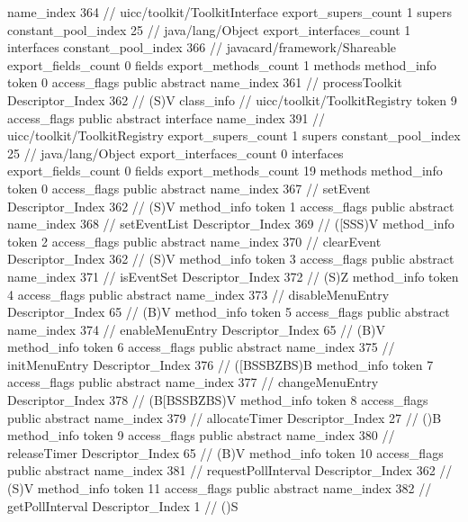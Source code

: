 {{{			name_index	364		// uicc/toolkit/ToolkitInterface
			export_supers_count	1
			supers {
				constant_pool_index	25		// java/lang/Object
			}
			export_interfaces_count	1
			interfaces {
				constant_pool_index	366		// javacard/framework/Shareable
			}
			export_fields_count	0
			fields {
			}
			export_methods_count	1
			methods {
				method_info {
					token	0
					access_flags	public abstract
					name_index	361		// processToolkit
					Descriptor_Index	362		// (S)V
				}
			}
		}
		class_info {		// uicc/toolkit/ToolkitRegistry
			token	9
			access_flags	public abstract interface
			name_index	391		// uicc/toolkit/ToolkitRegistry
			export_supers_count	1
			supers {
				constant_pool_index	25		// java/lang/Object
			}
			export_interfaces_count	0
			interfaces {
			}
			export_fields_count	0
			fields {
			}
			export_methods_count	19
			methods {
				method_info {
					token	0
					access_flags	public abstract
					name_index	367		// setEvent
					Descriptor_Index	362		// (S)V
				}
				method_info {
					token	1
					access_flags	public abstract
					name_index	368		// setEventList
					Descriptor_Index	369		// ([SSS)V
				}
				method_info {
					token	2
					access_flags	public abstract
					name_index	370		// clearEvent
					Descriptor_Index	362		// (S)V
				}
				method_info {
					token	3
					access_flags	public abstract
					name_index	371		// isEventSet
					Descriptor_Index	372		// (S)Z
				}
				method_info {
					token	4
					access_flags	public abstract
					name_index	373		// disableMenuEntry
					Descriptor_Index	65		// (B)V
				}
				method_info {
					token	5
					access_flags	public abstract
					name_index	374		// enableMenuEntry
					Descriptor_Index	65		// (B)V
				}
				method_info {
					token	6
					access_flags	public abstract
					name_index	375		// initMenuEntry
					Descriptor_Index	376		// ([BSSBZBS)B
				}
				method_info {
					token	7
					access_flags	public abstract
					name_index	377		// changeMenuEntry
					Descriptor_Index	378		// (B[BSSBZBS)V
				}
				method_info {
					token	8
					access_flags	public abstract
					name_index	379		// allocateTimer
					Descriptor_Index	27		// ()B
				}
				method_info {
					token	9
					access_flags	public abstract
					name_index	380		// releaseTimer
					Descriptor_Index	65		// (B)V
				}
				method_info {
					token	10
					access_flags	public abstract
					name_index	381		// requestPollInterval
					Descriptor_Index	362		// (S)V
				}
				method_info {
					token	11
					access_flags	public abstract
					name_index	382		// getPollInterval
					Descriptor_Index	1		// ()S
				}
}}}}
